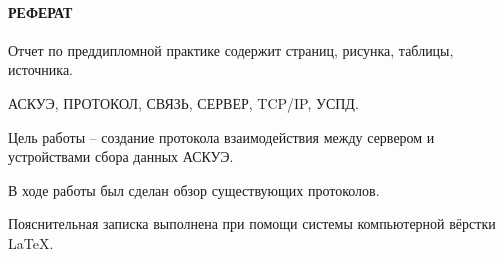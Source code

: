\newpage
{}
\paragraph*{\hfill РЕФЕРАТ \hfill}
Отчет по преддипломной практике содержит  страниц,  рисунка,   таблицы,  источника. %

АСКУЭ, ПРОТОКОЛ, СВЯЗЬ, СЕРВЕР, TCP/IP, УСПД.

Цель работы -- создание протокола взаимодействия между сервером и устройствами сбора данных АСКУЭ.

В ходе работы был сделан обзор существующих протоколов.

Пояснительная записка выполнена при помощи системы компьютерной вёрстки \LaTeX.